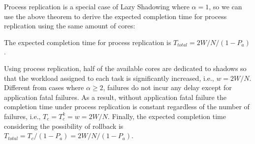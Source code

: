 Process replication is a special case of Lazy Shadowing where $\alpha=1$, so we can use the above theorem to derive the expected completion time for process replication using the same amount of cores:

\begin{corollary}
The expected completion time for process replication is $T_{total} = 2W/N / (1 - P_a)$.
\end{corollary}
\begin{IEEEproof}
Using process replication, half of the available cores are dedicated to shadows so that the workload assigned to each task is significantly increased, i.e., $w=2W/N$. Different from cases where $\alpha \ge 2$, failures do not incur any delay except for application fatal failures. %
As a result, without application fatal failure the completion time under process replication is constant regardless of the number of failures, i.e., $T_c=T_c^k=w=2W/N$. Finally, the expected completion time considering the possibility of rollback is $T_{total} = T_c / (1 - P_a) = 2W/N / (1 - P_a)$.
\end{IEEEproof}








